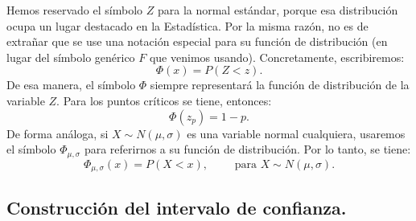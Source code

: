 Hemos reservado el símbolo $Z$ para la normal estándar, porque esa distribución ocupa un lugar destacado en la Estadística. Por  la misma razón, no es de extrañar que se use una notación especial para su función de distribución (en lugar del símbolo genérico $F$ que venimos usando). Concretamente, escribiremos:
\begin{equation}
\label{ch06:ecu:NotacionPhiFuncionDistribucionZ}
\Phi(x) = P(Z < z).
\end{equation}
De esa manera, el símbolo $\Phi$\index{$\Psi$} siempre representará la función de distribución de la variable  $Z$. Para los puntos críticos se tiene, entonces:
\[\Phi\left(z_{p}\right)=1-p.\]
De forma análoga, si $X\sim N(\mu,\sigma)$ es una variable normal cualquiera, usaremos el símbolo $\Phi_{\mu,\sigma}$\index{$\Phi_{\mu,\sigma}$}  para referirnos a su función de distribución. Por lo tanto, se tiene:
\[\Phi_{\mu,\sigma}(x) = P(X < x), \qquad \mbox { para } X\sim N(\mu,\sigma).\]


\subsection{Construcción del intervalo de confianza.}
\label{cap06:subsec:ConstruccionIntervaloConfianza}

